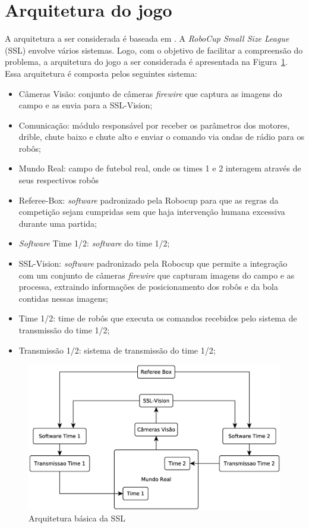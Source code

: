 \section{Arquitetura do jogo}\label{sec:arch_ssl}

A arquitetura a ser considerada é baseada em \cite{felixnavarro}.  A
\textit{RoboCup Small Size League} (SSL) envolve vários sistemas.  Logo, com o
objetivo de facilitar a compreensão do problema, a arquitetura do jogo a ser
considerada é apresentada na Figura~\ref{fig:arquitetura_ssl}. Essa arquitetura
é composta pelos seguintes sistema:

\begin{itemize}
  \item Câmeras Visão: conjunto de câmeras \textit{firewire} que captura as imagens do
        campo e as envia para a SSL-Vision;
  \item Comunicação: módulo responsável por receber os parâmetros
        dos motores, drible, chute baixo e chute alto e enviar o comando via
        ondas de rádio para os robôs;
  \item Mundo Real: campo de futebol real, onde os times 1 e 2 interagem
        através de seus respectivos robôs
  \item Referee-Box: \textit{software} padronizado pela Robocup para que as
        regras da competição sejam cumpridas sem que haja intervenção
        humana excessiva durante uma partida;
  \item \textit{Software} Time 1/2: \textit{software} do time 1/2;
  \item SSL-Vision: \textit{software} padronizado pela Robocup que permite a
        integração com um conjunto de câmeras \textit{firewire} que capturam
        imagens do campo e as processa, extraindo informações de posicionamento
        dos robôs e da bola contidas nessas imagens;
  \item Time 1/2: time de robôs que executa os comandos recebidos pelo
        sistema de transmissão do time 1/2;
  \item Transmissão 1/2: sistema de transmissão do time 1/2;
\end{itemize}

\begin{figure}[thpb]
  \centering
  \includegraphics[width= 0.8\linewidth]{img/arq_ssl}
  \caption{Arquitetura básica da SSL}\label{fig:arquitetura_ssl}
\end{figure}

